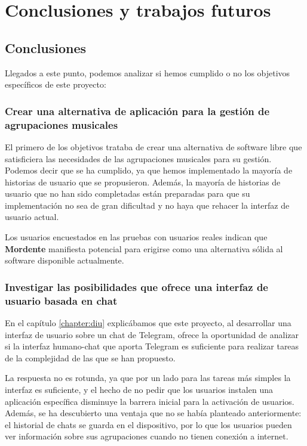 \chapter{Conclusiones y trabajos futuros}

\section{Conclusiones}



Llegados a este punto, podemos analizar si hemos cumplido o no los objetivos específicos de este proyecto:

\subsection{Crear una alternativa de aplicación para la gestión de agrupaciones musicales}

El primero de los objetivos trataba de crear una alternativa de software libre que satisficiera las necesidades de las agrupaciones musicales para su gestión. Podemos decir que se ha cumplido, ya que hemos implementado la mayoría de historias de usuario que se propusieron. Además, la mayoría de historias de usuario que no han sido completadas están preparadas para que su implementación no sea de gran dificultad y no haya que rehacer la interfaz de usuario actual.

Los usuarios encuestados en las pruebas con usuarios reales indican que \textbf{Mordente} manifiesta potencial para erigirse como una alternativa sólida al software disponible actualmente.

\subsection{Investigar las posibilidades que ofrece una interfaz de usuario basada en chat}\label{subsection:investigarInterfazChat}

En el capítulo \ref{chapter:diu} explicábamos que este proyecto, al desarrollar una interfaz de usuario sobre un chat de Telegram, ofrece la oportunidad de analizar si la interfaz humano-chat que aporta Telegram es suficiente para realizar tareas de la complejidad de las que se han propuesto.

La respuesta no es rotunda, ya que por un lado para las tareas más simples la interfaz es suficiente, y el hecho de no pedir que los usuarios instalen una aplicación específica disminuye la barrera inicial para la activación de usuarios. Además, se ha descubierto una ventaja que no se había planteado anteriormente: el historial de chats se guarda en el dispositivo, por lo que los usuarios pueden ver información sobre sus agrupaciones cuando no tienen conexión a internet.

